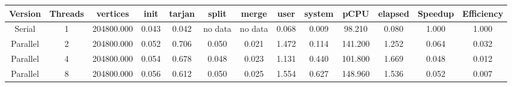 \begin{tabular}{|c|c|c|c|c|c|c|c|c|c|c|c|c|}
\toprule
 Version &  Threads &   vertices &  init &  tarjan &   split &   merge &  user &  system &    pCPU &  elapsed &  Speedup &  Efficiency \\
\midrule
  Serial &        1 & 204800.000 & 0.043 &   0.042 & no data & no data & 0.068 &   0.009 &  98.210 &    0.080 &    1.000 &       1.000 \\
Parallel &        2 & 204800.000 & 0.052 &   0.706 &   0.050 &   0.021 & 1.472 &   0.114 & 141.200 &    1.252 &    0.064 &       0.032 \\
Parallel &        4 & 204800.000 & 0.054 &   0.678 &   0.048 &   0.023 & 1.131 &   0.440 & 101.800 &    1.669 &    0.048 &       0.012 \\
Parallel &        8 & 204800.000 & 0.056 &   0.612 &   0.050 &   0.025 & 1.554 &   0.627 & 148.960 &    1.536 &    0.052 &       0.007 \\
\bottomrule
\end{tabular}
